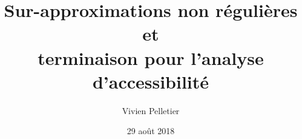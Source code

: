 \author{
  Vivien Pelletier
}
\title[Présentation Tezos]{Sur-approximations non régulières et\\ terminaison pour l'analyse d'accessibilité}
\date{29 août 2018}
